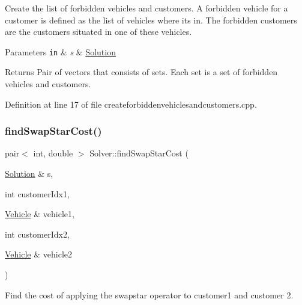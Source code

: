 Create the list of forbidden vehicles and customers. A forbidden vehicle for a customer is defined as the list of vehicles where it\textquotesingle{}s in. The forbidden customers are the customers situated in one of these vehicles. 


\begin{DoxyParams}[1]{Parameters}
\mbox{\tt in}  & {\em s} & \hyperlink{class_solution}{Solution}\\
\hline
\end{DoxyParams}
\begin{DoxyReturn}{Returns}
Pair of vectors that consists of sets. Each set is a set of forbidden vehicles and customers. 
\end{DoxyReturn}


Definition at line 17 of file createforbiddenvehiclesandcustomers.\+cpp.

\mbox{\label{class_solver_a8eb89af6db4d6b846667740878a36af8}} 
\subsubsection{\texorpdfstring{find\+Swap\+Star\+Cost()}{findSwapStarCost()}}
{\footnotesize\ttfamily pair$<$ int, double $>$ Solver\+::find\+Swap\+Star\+Cost (\begin{DoxyParamCaption}\item[{\hyperlink{class_solution}{Solution} \&}]{s,  }\item[{int}]{customer\+Idx1,  }\item[{\hyperlink{class_vehicle}{Vehicle} \&}]{vehicle1,  }\item[{int}]{customer\+Idx2,  }\item[{\hyperlink{class_vehicle}{Vehicle} \&}]{vehicle2 }\end{DoxyParamCaption})\hspace{0.3cm}{\ttfamily [private]}}



Find the cost of applying the swapstar operator to customer1 and customer 2. 


